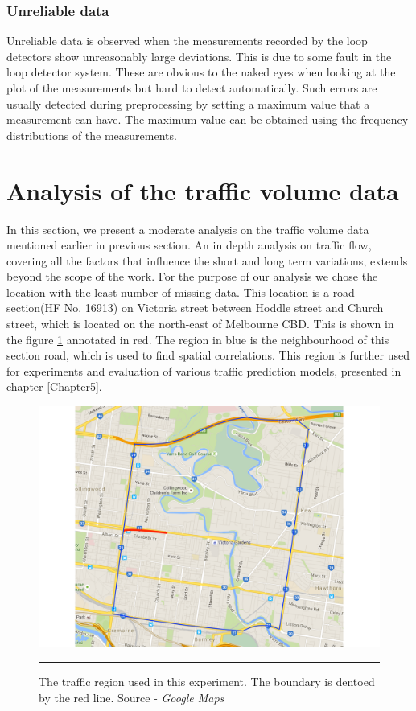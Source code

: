 \subsubsection{Unreliable data}
Unreliable data is observed when the measurements recorded by the loop detectors show unreasonably
large deviations. This is due to some fault in the loop detector system. These are obvious to the
naked eyes when looking at the plot of the measurements but hard to detect automatically. Such errors
are usually detected during preprocessing by setting a maximum value that a measurement can have. The
maximum value can be obtained using the frequency distributions of the measurements.

\section{Analysis of the traffic volume data}

In this section, we present a moderate analysis on the traffic volume data mentioned earlier in
previous section. An in depth analysis on traffic flow, covering all the factors that influence the
short and long term variations, extends beyond the scope of the work. For the purpose of our analysis
we chose the location with the least number of missing data. This location is a road section(HF No.
16913) on Victoria street between Hoddle street and Church street, which is located on the north-east
of Melbourne CBD. This is shown in the figure \ref{fig:ExperimentRegion} annotated in red. The region
in  blue is the neighbourhood of this section road, which is used to find spatial correlations. This
region is further used for experiments and evaluation of various traffic prediction models, presented
in chapter \ref{Chapter5}.

\begin{figure}[htbp]
  \centering
    \includegraphics[width=\textwidth]{Figures/experiment-region.pdf}
    \rule{35em}{0.5pt}
  \caption[Experiment traffic region]{The traffic region used in this experiment. The boundary is
   dentoed by the red line. Source - \textit{Google Maps}}
  \label{fig:ExperimentRegion}
\end{figure}


